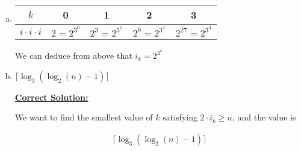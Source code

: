 \documentclass[12pt]{article}
\begin{document}
\begin{enumerate}[a.]
    \item

    \begin{tabular}{|c|c|c|c|c|}
        \hline
        $k$ & 0 & 1 & 2 & 3\\
        \hline
        $i \cdot i \cdot i$ & $2 = 2^{3^0}$ & $2^3 = 2^{3^1}$ & $2^9 = 2^{3^2}$ & $2^27 = 2^{3^3}$\\
        \hline
    \end{tabular}

    We can deduce from above that $i_k = 2^{3^k}$

    \item

    $\lceil \log_3 (\log_2 (n) - 1) \rceil$

    \newpage

    \begin{mdframed}
        \underline{\textbf{Correct Solution:}}

        \bigskip

        \color{red} We want to find the smallest value of $k$ satisfying $2 \cdot
        i_k \geq n$, and the value is\color{black}

        \begin{align*}
            \lceil \log_3 (\log_2 (n) - 1) \rceil
        \end{align*}
    \end{mdframed}

\end{enumerate}
\end{document}
